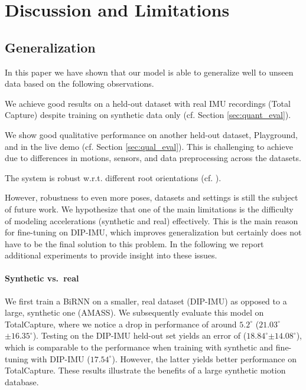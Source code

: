 \documentclass[acmtog]{acmart}
\begin{document}
\section{Discussion and Limitations}\subsection{Generalization}\label{sec:generalization}
In this paper we have shown that our model is able to generalize well to unseen data based on the following observations.
\begin{inparaenum}[(i)]
\item We achieve good results on a held-out dataset with real IMU recordings (Total Capture) despite training on synthetic data only (cf. Section \ref{sec:quant_eval}).
\item We show good qualitative performance on another held-out dataset, Playground, and in the live demo (cf. Section \ref{sec:qual_eval}). This is challenging to achieve due to differences in motions, sensors, and data preprocessing across the datasets.
\item The system is robust w.r.t. different root orientations (cf. ).
\end{inparaenum}

However, robustness to even more poses, datasets and settings is still the subject of future work. We hypothesize that one of the main limitations is the difficulty of modeling accelerations (synthetic and real) effectively. This is the main reason for fine-tuning on DIP-IMU, which improves generalization but certainly does not have to be the final solution to this problem. In the following we report additional experiments to provide insight into these issues.

\paragraph*{Synthetic vs.~real}
We first train a BiRNN on a smaller, real dataset (DIP-IMU) as opposed to a large, synthetic one (AMASS). We subsequently evaluate this model on TotalCapture, where we notice a drop in performance of around $5.2^\circ$ ($21.03^\circ$$\pm 16.35^\circ$). 
Testing on the DIP-IMU held-out set yields an error of ($18.84^\circ$$\pm 14.08^\circ$), which is comparable to the performance when training with synthetic and fine-tuning with DIP-IMU ($17.54^\circ$). However, the latter yields better performance on TotalCapture. These results illustrate the benefits of a large synthetic motion database. 
\end{document}
